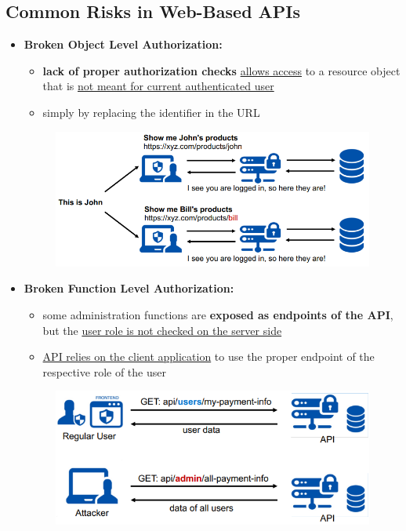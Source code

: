 \documentclass[ieeetran]{article}
\begin{document}
\subsection{Common Risks in Web-Based APIs} %
\label{sub:common_risks_in_web_based_aPIs}

\begin{itemize}
  \item \textbf{Broken Object Level Authorization:}
	  \begin{itemize}
	    \item \textbf{lack of proper authorization checks} \underline{allows access} to a resource object that is \underline{not meant for current authenticated user} 
	\item simply by replacing the identifier in the URL
	  \end{itemize}
	  \begin{figure}[h!]
	    \centering
	    \includegraphics[width=0.7\linewidth]{a1securityrisk.png}
	    \label{fig:a1securityrisk_png}
	  \end{figure}

\item \textbf{Broken Function Level Authorization:}
\begin{itemize}
  \item some administration functions are \textbf{exposed as endpoints of the API}, but the \underline{user role is not checked on the server side}
\item \underline{API relies on the client application} to use the proper endpoint of the respective role of the user
\end{itemize}
\begin{figure}[h!]
  \centering
  \includegraphics[width=0.68\linewidth]{a5securityrisk.png}
  \label{fig:a5securityrisk_png}
\end{figure}
\end{itemize}
\end{document}
